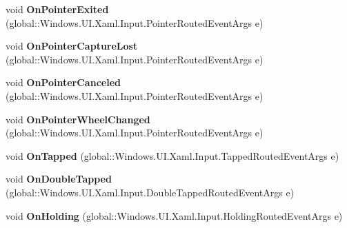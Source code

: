 \begin{DoxyCompactItemize}
void {\bfseries On\+Pointer\+Exited} (global\+::\+Windows.\+U\+I.\+Xaml.\+Input.\+Pointer\+Routed\+Event\+Args e)
\item 
\mbox{\label{interface_windows_1_1_u_i_1_1_xaml_1_1_controls_1_1_i_control_overrides_a6821de9a94eb91eef66fd171fcdd33ea}} 
void {\bfseries On\+Pointer\+Capture\+Lost} (global\+::\+Windows.\+U\+I.\+Xaml.\+Input.\+Pointer\+Routed\+Event\+Args e)
\item 
\mbox{\label{interface_windows_1_1_u_i_1_1_xaml_1_1_controls_1_1_i_control_overrides_af3cfd6f136b89bd611f4f199a47e9103}} 
void {\bfseries On\+Pointer\+Canceled} (global\+::\+Windows.\+U\+I.\+Xaml.\+Input.\+Pointer\+Routed\+Event\+Args e)
\item 
\mbox{\label{interface_windows_1_1_u_i_1_1_xaml_1_1_controls_1_1_i_control_overrides_a718444e3da7d52bbefe627be97c6acb1}} 
void {\bfseries On\+Pointer\+Wheel\+Changed} (global\+::\+Windows.\+U\+I.\+Xaml.\+Input.\+Pointer\+Routed\+Event\+Args e)
\item 
\mbox{\label{interface_windows_1_1_u_i_1_1_xaml_1_1_controls_1_1_i_control_overrides_a03ba05ffb887e2d5b8a4e46f27ed4817}} 
void {\bfseries On\+Tapped} (global\+::\+Windows.\+U\+I.\+Xaml.\+Input.\+Tapped\+Routed\+Event\+Args e)
\item 
\mbox{\label{interface_windows_1_1_u_i_1_1_xaml_1_1_controls_1_1_i_control_overrides_a5a5f4e8f42a2fe161802c62c49b6876c}} 
void {\bfseries On\+Double\+Tapped} (global\+::\+Windows.\+U\+I.\+Xaml.\+Input.\+Double\+Tapped\+Routed\+Event\+Args e)
\item 
\mbox{\label{interface_windows_1_1_u_i_1_1_xaml_1_1_controls_1_1_i_control_overrides_a92652b416b1ff3a471b4cf7226c1f60f}} 
void {\bfseries On\+Holding} (global\+::\+Windows.\+U\+I.\+Xaml.\+Input.\+Holding\+Routed\+Event\+Args e)
\item 
\mbox{\label{interface_windows_1_1_u_i_1_1_xaml_1_1_controls_1_1_i_control_overrides_a5fbc80a16d3e6c89a86a5b99d3cca69f}} 

\end{DoxyCompactItemize}
